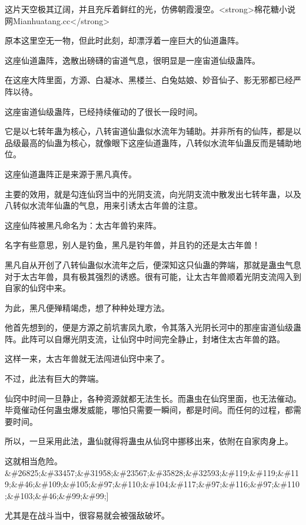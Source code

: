 
\begin{this_body}

这片天空极其辽阔，并且充斥着鲜红的光，仿佛朝霞漫空。<strong>棉花糖小说网Mianhuatang.cc</strong>

原本这里空无一物，但此时此刻，却漂浮着一座巨大的仙道蛊阵。

这座仙道蛊阵，逸散出磅礴的宙道气息，很明显是一座宙道仙级蛊阵。

在这座大阵里面，方源、白凝冰、黑楼兰、白兔姑娘、妙音仙子、影无邪都已经严阵以待。

这座宙道仙级蛊阵，已经持续催动的了很长一段时间。

它是以七转年蛊为核心，八转宙道仙蛊似水流年为辅助。并非所有的仙阵，都是以品级最高的仙蛊为核心，就像眼下这座仙道蛊阵，八转似水流年仙蛊反而是辅助地位。

这座仙道蛊阵正是来源于黑凡真传。

主要的效用，就是勾连仙窍当中的光阴支流，向光阴支流中散发出七转年蛊，以及八转似水流年仙蛊的气息，用来引诱太古年兽的注意。

这座仙阵被黑凡命名为：太古年兽钓来阵。

名字有些意思，别人是钓鱼，黑凡是钓年兽，并且钓的还是太古年兽！

黑凡自从开创了八转仙蛊似水流年之后，便深知这只仙蛊的弊端，那就是蛊虫气息对于太古年兽，具有极其强烈的诱惑。很有可能，让太古年兽顺着光阴支流闯入到自家的仙窍中来。

为此，黑凡便殚精竭虑，想了种种处理方法。

他首先想到的，便是方源之前坑害凤九歌，令其落入光阴长河中的那座宙道仙级蛊阵。此阵可以自爆光阴支流，让仙窍中时间完全静止，封堵住太古年兽的路。

这样一来，太古年兽就无法闯进仙窍中来了。

不过，此法有巨大的弊端。

仙窍中时间一旦静止，各种资源就都无法生长。而蛊虫在仙窍里面，也无法催动。毕竟催动任何蛊虫爆发威能，哪怕只需要一瞬间，都是时间。而任何的过程，都需要时间。

所以，一旦采用此法，蛊仙就得将蛊虫从仙窍中挪移出来，依附在自家肉身上。

这就相当危险。\&\#26825;\&\#33457;\&\#31958;\&\#23567;\&\#35828;\&\#32593;\&\#119;\&\#119;\&\#119;\&\#46;\&\#109;\&\#105;\&\#97;\&\#110;\&\#104;\&\#117;\&\#97;\&\#116;\&\#97;\&\#110;\&\#103;\&\#46;\&\#99;\&\#99;]

尤其是在战斗当中，很容易就会被强敌破坏。


\end{this_body}
